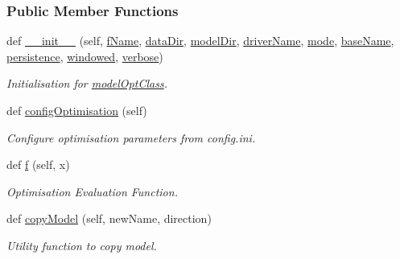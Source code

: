 \subsubsection*{Public Member Functions}
\begin{DoxyCompactItemize}
\item 
def \hyperlink{group__icubclient__SAM__Core_a77bce579095af6c3bdf0addf92826bcf}{\+\_\+\+\_\+init\+\_\+\+\_\+} (self, \hyperlink{group__icubclient__SAM__Core_ada011a2088e06465883dae58fb0b8e8a}{f\+Name}, \hyperlink{group__icubclient__SAM__Core_a6566d06a5c1cd55aaccf308c102c0d01}{data\+Dir}, \hyperlink{group__icubclient__SAM__Core_ae1694c9aa55dfbed3bebf85db58db839}{model\+Dir}, \hyperlink{group__icubclient__SAM__Core_a6cb215002ede64a06ae5a11ffe08e757}{driver\+Name}, \hyperlink{group__icubclient__SAM__Core_a336eed4031c37416f75c6d759f905a0e}{mode}, \hyperlink{group__icubclient__SAM__Core_a7bb67f99578949d8db57fb6461f8a7d4}{base\+Name}, \hyperlink{group__icubclient__SAM__Core_ae269bb1c23cb3337287b48cdbff04e22}{persistence}, \hyperlink{group__icubclient__SAM__Core_aa33d02293d13c31686171e4e7802a905}{windowed}, \hyperlink{group__icubclient__SAM__Core_adb6adf608fddf052c5bdee83d407b17d}{verbose})
\begin{DoxyCompactList}\small\item\em Initialisation for \hyperlink{group__icubclient__SAM__Core_classSAM_1_1SAM__Core_1_1samOptimiser_1_1modelOptClass}{model\+Opt\+Class}. \end{DoxyCompactList}\item 
def \hyperlink{group__icubclient__SAM__Core_a3595941adaf6ec042054272648e778e5}{config\+Optimisation} (self)
\begin{DoxyCompactList}\small\item\em Configure optimisation parameters from config.\+ini. \end{DoxyCompactList}\item 
def \hyperlink{group__icubclient__SAM__Core_a8d4a0fad429d8fab65c4a13e2141735e}{f} (self, x)
\begin{DoxyCompactList}\small\item\em Optimisation Evaluation Function. \end{DoxyCompactList}\item 
def \hyperlink{group__icubclient__SAM__Core_a578d3f753546bcfbc1cbe94aa34a0f68}{copy\+Model} (self, new\+Name, direction)
\begin{DoxyCompactList}\small\item\em Utility function to copy model. \end{DoxyCompactList}\end{DoxyCompactItemize}
